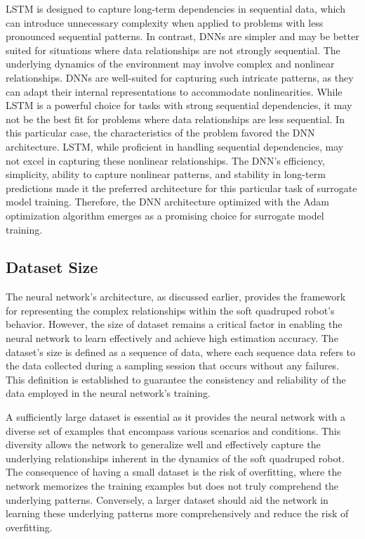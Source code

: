 LSTM is designed to capture long-term dependencies in sequential data, which can introduce unnecessary complexity when applied to problems with less pronounced sequential patterns. In contrast, DNNs are simpler and may be better suited for situations where data relationships are not strongly sequential. The underlying dynamics of the environment may involve complex and nonlinear relationships. DNNs are well-suited for capturing such intricate patterns, as they can adapt their internal representations to accommodate nonlinearities. While LSTM is a powerful choice for tasks with strong sequential dependencies, it may not be the best fit for problems where data relationships are less sequential. In this particular case, the characteristics of the problem favored the DNN architecture. LSTM, while proficient in handling sequential dependencies, may not excel in capturing these nonlinear relationships. The DNN's efficiency, simplicity, ability to capture nonlinear patterns, and stability in long-term predictions made it the preferred architecture for this particular task of surrogate model training. Therefore, the DNN architecture optimized with the Adam optimization algorithm emerges as a promising choice for surrogate model training.

\subsection{Dataset Size}
The neural network's architecture, as discussed earlier, provides the framework for representing the complex relationships within the soft quadruped robot's behavior. However, the size of dataset remains a critical factor in enabling the neural network to learn effectively and achieve high estimation accuracy. The dataset's size is defined as a sequence of data, where each sequence data refers to the data collected during a sampling session that occurs without any failures. This definition is established to guarantee the consistency and reliability of the data employed in the neural network's training.

A sufficiently large dataset is essential as it provides the neural network with a diverse set of examples that encompass various scenarios and conditions. This diversity allows the network to generalize well and effectively capture the underlying relationships inherent in the dynamics of the soft quadruped robot. The consequence of having a small dataset is the risk of overfitting, where the network memorizes the training examples but does not truly comprehend the underlying patterns. Conversely, a larger dataset should aid the network in learning these underlying patterns more comprehensively and reduce the risk of overfitting. 


